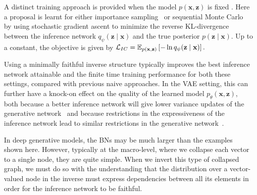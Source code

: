 A distinct training approach is provided when the model $p(\mathbf{x},\mathbf{z})$ is fixed \citep{PapamakariosMurray2015}.
Here a proposal is learnt for either importance sampling~\citep{LeEtAl2016}
or sequential Monte Carlo~\citep{PaigeWood2016} by using stochastic gradient ascent to
minimize the reverse KL-divergence between the inference network $q_\psi(\mathbf{z}\mid\mathbf{x})$ and the true posterior
$p(\mathbf{z}\mid\mathbf{x})$. Up to a constant, the objective is given by
$\mathcal{L}_{\sc IC} = \mathbb{E}_{p(\mathbf{x},\mathbf{z})}\left[-\ln q_\psi(\mathbf{z}\mid\mathbf{x})\right].$

Using a minimally faithful inverse structure typically improves the best inference network attainable and the finite time training performance for both these settings, compared with previous naive approaches.
In the VAE setting, this can further have a knock-on effect on the quality of the learned model $p_\theta(\mathbf{x},\mathbf{z})$, both because a better inference network will give lower variance updates of the generative network~\citep{rainforth2018tighter} and because restrictions in the expressiveness of the inference network lead to similar restrictions in the generative network~\citep{cremer2017reinterpreting,cremer2018inference}.

In deep generative models, the BNs may be much larger than the examples shown here. However, typically at the macro-level, where we collapse each vector to a single node, they are quite simple. When we invert this type of collapsed graph, we must do so with the understanding that the distribution over a vector-valued node in the inverse must express dependencies between all its elements in order for the inference network to be faithful.

